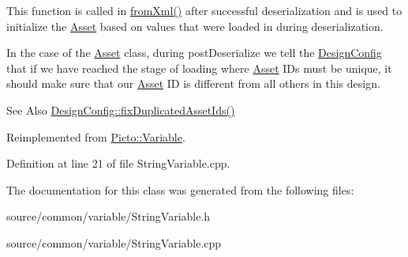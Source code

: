 This function is called in \hyperlink{class_picto_1_1_asset_a8bed4da09ecb1c07ce0dab313a9aba67}{from\-Xml()} after successful deserialization and is used to initialize the \hyperlink{class_picto_1_1_asset}{Asset} based on values that were loaded in during deserialization. 

In the case of the \hyperlink{class_picto_1_1_asset}{Asset} class, during post\-Deserialize we tell the \hyperlink{class_picto_1_1_design_config}{Design\-Config} that if we have reached the stage of loading where \hyperlink{class_picto_1_1_asset}{Asset} I\-Ds must be unique, it should make sure that our \hyperlink{class_picto_1_1_asset}{Asset} I\-D is different from all others in this design. \begin{DoxySeeAlso}{See Also}
\hyperlink{class_picto_1_1_design_config_ab57e0738b97e4358ab09530cd6815fc0}{Design\-Config\-::fix\-Duplicated\-Asset\-Ids()} 
\end{DoxySeeAlso}


Reimplemented from \hyperlink{class_picto_1_1_variable_a447e12ef138cdd99ae9ba870ed3b5174}{Picto\-::\-Variable}.



Definition at line 21 of file String\-Variable.\-cpp.



The documentation for this class was generated from the following files\-:\begin{DoxyCompactItemize}
\item 
source/common/variable/String\-Variable.\-h\item 
source/common/variable/String\-Variable.\-cpp\end{DoxyCompactItemize}
